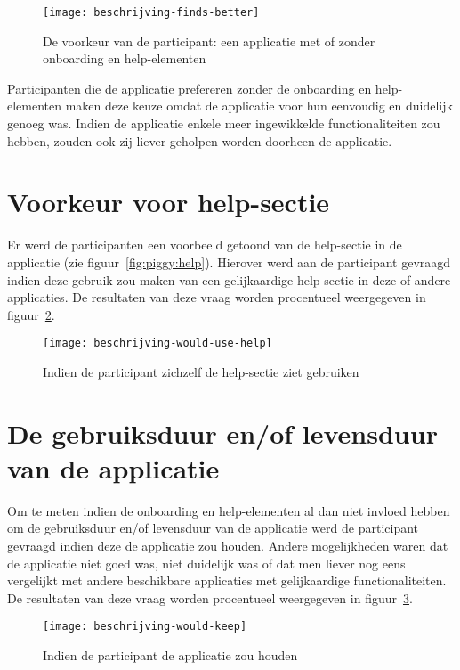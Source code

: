 \begin{figure}[h]
    \centering
    \texttt{[image: beschrijving-finds-better]}
    \caption{De voorkeur van de participant: een applicatie met of zonder onboarding en help-elementen}
    \label{fig:beschrijving-finds-better}
\end{figure}

Participanten die de applicatie prefereren zonder de onboarding en help-elementen maken deze keuze omdat de applicatie voor hun eenvoudig en duidelijk genoeg was. Indien de applicatie enkele meer ingewikkelde functionaliteiten zou hebben, zouden ook zij liever geholpen worden doorheen de applicatie.

\section{Voorkeur voor help-sectie}
\label{sec:voorkeur-help}

Er werd de participanten een voorbeeld getoond van de help-sectie in de applicatie (zie figuur~\ref{fig:piggy:help}). Hierover werd aan de participant gevraagd indien deze gebruik zou maken van een gelijkaardige help-sectie in deze of andere applicaties. De resultaten van deze vraag worden procentueel weergegeven in figuur~\ref{fig:beschrijving-would-use-help}.

\begin{figure}[h]
    \centering
    \texttt{[image: beschrijving-would-use-help]}
    \caption{Indien de participant zichzelf de help-sectie ziet gebruiken}
    \label{fig:beschrijving-would-use-help}
\end{figure}

\section{De gebruiksduur en/of levensduur van de applicatie}
\label{sec:gebruiksduur}

Om te meten indien de onboarding en help-elementen al dan niet invloed hebben om de gebruiksduur en/of levensduur van de applicatie werd de participant gevraagd indien deze de applicatie zou houden. Andere mogelijkheden waren dat de applicatie niet goed was, niet duidelijk was of dat men liever nog eens vergelijkt met andere beschikbare applicaties met gelijkaardige functionaliteiten. De resultaten van deze vraag worden procentueel weergegeven in figuur~\ref{fig:beschrijving-would-keep}.

\begin{figure}[h]
    \centering
    \texttt{[image: beschrijving-would-keep]}
    \caption{Indien de participant de applicatie zou houden}
    \label{fig:beschrijving-would-keep}
\end{figure}
